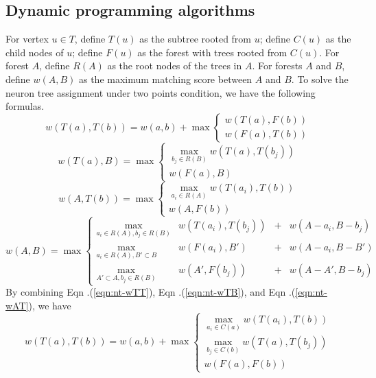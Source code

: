 \subsection{Dynamic programming algorithms}
For vertex $u \in T$, define $T(u)$ as the subtree rooted from $u$; define $C(u)$ as the child nodes of $u$; define $F(u)$ as the forest with trees rooted from $C(u)$. For forest $A$, define $R(A)$ as the root nodes of the trees in $A$. For forests $A$ and $B$, define $w(A,B)$ as the maximum matching score between $A$ and $B$. To solve the neuron tree assignment under two points condition, we have the following formulas.
\begin{equation} \label{eqn:nt-wTT}
w(T(a), T(b)) = w(a,b) + \max\left\{ \begin{array}{l}
                    w(T(a), F(b)) \\
					w(F(a), T(b))
					\end{array} \right.
\end{equation}
\begin{equation}\label{eqn:nt-wTB}
w(T(a), B) = \max\left\{ \begin{array}{l}
                    \max_{b_j \in R(B)}w(T(a), T(b_j)) \\
	                w(F(a), B)
			     \end{array} \right.
\end{equation}
\begin{equation}\label{eqn:nt-wAT}
w(A, T(b)) = \max\left\{ \begin{array}{l}
                  \max_{a_i \in R(A)} w(T(a_i), T(b))\\
				  w(A, F(b))
				  \end{array} \right.
\end{equation}
\begin{equation}
w(A,B) = \max\left\{ \begin{array}{llcl}
			 \max_{a_i \in R(A), b_j \in R(B)} & w(T(a_i), T(b_j)) & + & w(A-a_i, B-b_j) \\
			 \max_{a_i \in R(A), B' \subset B} & w(F(a_i), B') & + & w(A-a_i, B-B') \\
			 \max_{A' \subset A, b_j \in R(B)} & w(A', F(b_j)) & + & w(A-A', B-b_j)
	\end{array} \right.
\end{equation}
By combining Eqn .(\ref{eqn:nt-wTT}), Eqn .(\ref{eqn:nt-wTB}), and Eqn .(\ref{eqn:nt-wAT}), we have
\begin{equation}
w(T(a), T(b)) = w(a,b) + \max\left\{ \begin{array}{l}
                    \max_{a_i \in C(a)} w(T(a_i), T(b)) \\
                    \max_{b_j \in C(b)} w(T(a), T(b_j)) \\
					w(F(a), F(b))
					\end{array} \right.
\end{equation}

